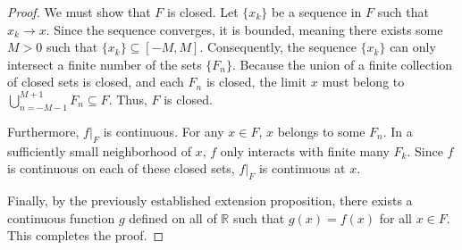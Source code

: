 \documentclass[../main.tex]{subfiles}
\begin{document}
\begin{proof}
	We must show that $F$ is closed. Let $\{x_k\}$ be a sequence in $F$ such that $x_k \to x$. Since the sequence converges, it is bounded, meaning there exists some $M > 0$ such that $\{x_k\} \subseteq [-M, M]$. Consequently, the sequence $\{x_k\}$ can only intersect a finite number of the sets $\{F_n\}$. Because the union of a finite collection of closed sets is closed, and each $F_n$ is closed, the limit $x$ must belong to $\bigcup_{n=-M-1}^{M+1} F_n \subseteq F$. Thus, $F$ is closed.

	Furthermore, $f|_F$ is continuous. For any $x \in F$, $x$ belongs to some $F_n$. In a sufficiently small neighborhood of $x$, $f$ only interacts with finite many $F_k$. Since $f$ is continuous on each of these closed sets, $f|_F$ is continuous at $x$. 

	Finally, by the previously established extension proposition, there exists a continuous function $g$ defined on all of $\mathbb{R}$ such that $g(x) = f(x)$ for all $x \in F$. This completes the proof.
\end{proof}
\end{document}
